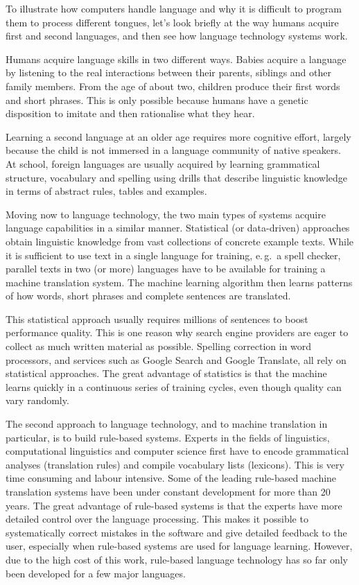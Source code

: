 \begin{multicols}{2}
To illustrate how computers handle language and why it is difficult to program them to process different tongues, let’s look briefly at the way humans acquire first and second languages, and then see how language technology systems work.

Humans acquire language skills in two different ways. Babies acquire a language by listening to the real interactions between their parents, siblings and other family members. From the age of about two, children produce their first words and short phrases. This is only possible because humans have a genetic disposition to imitate and then rationalise what they hear. 

Learning a second language at an older age requires more cognitive effort, largely because the child is not immersed in a language community of native speakers. At school, foreign languages are usually acquired by learning grammatical structure, vocabulary and spelling using drills that describe linguistic knowledge in terms of abstract rules, tables and examples.


Moving now to language technology, the two main types of systems acquire language capabilities in a similar manner. Statistical (or data-driven) approaches obtain linguistic knowledge from vast collections of concrete example texts. While it is sufficient to use text in a single language for training, e.\,g.~a spell checker, parallel texts in two (or more) languages have to be available for training a machine translation system. The machine learning algorithm then learns patterns of how words, short phrases and complete sentences are translated. 

This statistical approach usually requires millions of sentences to boost performance quality. This is one reason why search engine providers are eager to collect as much written material as possible. Spelling correction in word processors, and services such as Google Search and Google Translate, all rely on statistical approaches. The great advantage of statistics is that the machine learns quickly in a continuous series of training cycles, even though quality can vary randomly.

The second approach to language technology, and to machine translation in particular, is to build rule-based systems. Experts in the fields of linguistics, computational linguistics and computer science first have to encode grammatical analyses (translation rules) and compile vocabulary lists (lexicons). This is very time consuming and labour intensive. Some of the leading rule-based machine translation systems have been under constant development for more than 20 years. The great advantage of rule-based systems is that the experts have more detailed control over the language processing. This makes it possible to systematically correct mistakes in the software and give detailed feedback to the user, especially when rule-based systems are used for language learning. However, due to the high cost of this work, rule-based language technology has so far only been developed for a few major languages. 


\end{multicols}

